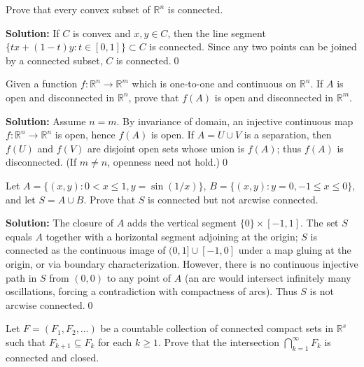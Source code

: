 \begin{problembox}
Prove that every convex subset of $\mathbb{R}^n$ is connected.
\end{problembox}

\noindent\textbf{Solution:}
If $C$ is convex and $x,y\in C$, then the line segment $\{tx+(1-t)y: t\in[0,1]\}\subset C$ is connected. Since any two points can be joined by a connected subset, $C$ is connected.\qed



\begin{problembox}
Given a function $f : \mathbb{R}^n \to \mathbb{R}^m$ which is one-to-one and continuous on $\mathbb{R}^n$. If $A$ is open and disconnected in $\mathbb{R}^n$, prove that $f(A)$ is open and disconnected in $\mathbb{R}^m$.
\end{problembox}

\noindent\textbf{Solution:}
Assume $n=m$. By invariance of domain, an injective continuous map $f:\mathbb{R}^n\to\mathbb{R}^n$ is open, hence $f(A)$ is open. If $A=U\cup V$ is a separation, then $f(U)$ and $f(V)$ are disjoint open sets whose union is $f(A)$; thus $f(A)$ is disconnected. (If $m\ne n$, openness need not hold.)\qed



\begin{problembox}
Let $A = \{(x, y) : 0 < x \leq 1, y = \sin(1/x)\}$, $B = \{(x, y) : y = 0, -1 \leq x \leq 0\}$, and let $S = A \cup B$. Prove that $S$ is connected but not arcwise connected.
\end{problembox}

\noindent\textbf{Solution:}
The closure of $A$ adds the vertical segment $\{0\}\times[-1,1]$. The set $S$ equals $A$ together with a horizontal segment adjoining at the origin; $S$ is connected as the continuous image of $(0,1]\cup[-1,0]$ under a map gluing at the origin, or via boundary characterization. However, there is no continuous injective path in $S$ from $(0,0)$ to any point of $A$ (an arc would intersect infinitely many oscillations, forcing a contradiction with compactness of arcs). Thus $S$ is not arcwise connected.\qed



\begin{problembox}
Let $F = (F_1, F_2, \ldots)$ be a countable collection of connected compact sets in $\mathbb{R}^s$ such that $F_{k+1} \subseteq F_k$ for each $k \geq 1$. Prove that the intersection $\bigcap_{k=1}^{\infty} F_k$ is connected and closed.
\end{problembox}

